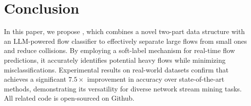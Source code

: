 \section{Conclusion}

In this paper, we propose \alg{}, which combines a novel two-part data structure with an LLM-powered flow classifier to effectively separate large flows from small ones and reduce collisions. By employing a soft-label mechanism for real-time flow predictions, it accurately identifies potential heavy flows while minimizing misclassifications. Experimental results on real-world datasets confirm that \alg{} achieves a significant \(7.5\times\) improvement in accuracy over state-of-the-art methods, demonstrating its versatility for diverse network stream mining tasks.
%
All related code is open-sourced on Github.


